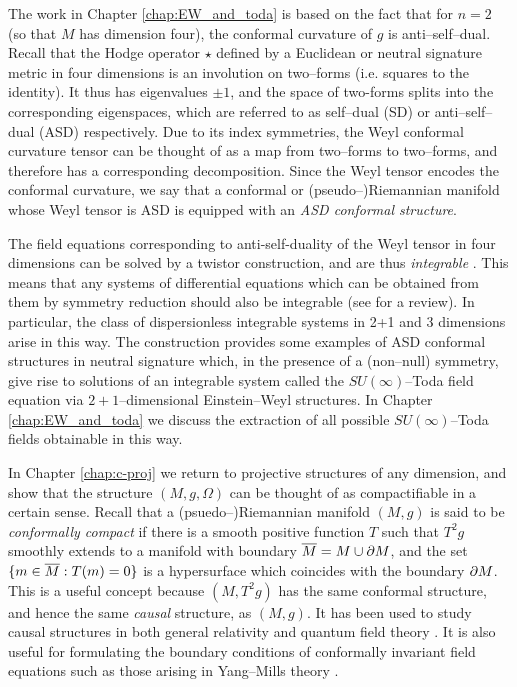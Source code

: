 The work in Chapter \ref{chap:EW_and_toda} is based on the fact that for $n=2$ (so that $M$ has dimension four), the conformal
curvature of $g$ is anti--self--dual. Recall that the Hodge operator
$\star$ defined by a Euclidean or neutral signature metric in four
dimensions is an involution on two--forms (i.e. squares to the identity).
It thus has eigenvalues $\pm1$, and the space of two-forms splits
into the corresponding eigenspaces, which are referred to as self--dual
(SD) or anti--self--dual (ASD) respectively. Due to its index symmetries,
the Weyl conformal curvature tensor can be thought of as a map from two--forms to two--forms,
and therefore has a corresponding decomposition. Since the Weyl tensor
encodes the conformal curvature, we say that a conformal or (pseudo--)Riemannian
manifold whose Weyl tensor is ASD is equipped with an \textit{ASD
conformal structure}.

The field equations corresponding to anti-self-duality of the Weyl
tensor in four dimensions can be solved by a twistor construction,
and are thus \textit{integrable} \cite{wardGauge}. This means that any systems of differential
equations which can be obtained from them by symmetry reduction should
also be integrable (see \cite{MW} for a review). In particular, the class of dispersionless
integrable systems in 2+1 and 3 dimensions arise in this way. The
construction \cite{DM} provides some examples of
ASD conformal structures in neutral signature which, in the presence
of a (non--null) symmetry, give rise to solutions of an integrable
system called the $SU(\infty)$--Toda field equation via $2+1$--dimensional
Einstein--Weyl structures. In Chapter \ref{chap:EW_and_toda} we discuss the extraction
of all possible $SU(\infty)$--Toda fields obtainable in this way.

In Chapter \ref{chap:c-proj} we return to projective structures of any dimension, and show that the structure $(M,g,\Omega)$ can be thought of as compactifiable in a certain sense. Recall that a (psuedo--)Riemannian manifold $(M,g)$ is said to be \textit{conformally compact} if there is a smooth positive function $T$ such that $T^2g$ smoothly extends to a manifold with boundary $\overline{M}=M\cup\partial M$, and the set $\{m\in\overline{M}:T(m)=0\}$ is a hypersurface which coincides with the boundary $\partial M$.  This is a useful concept because $(M,T^2g)$ has the same conformal structure, and hence the same \textit{causal} structure, as $(M,g)$. It has been used to study causal structures in both general relativity \cite{penrose65} and quantum field theory \cite{witten}. It is also useful for formulating the boundary conditions of conformally invariant field equations such as those arising in Yang--Mills theory \cite{uhlen}.

